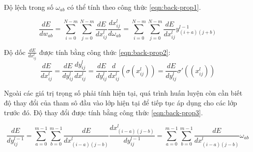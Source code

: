 Độ lệch trong số $\omega_{ab}$ có thể tính theo công thức \ref{eqn:back-prop1}.

\begin{equation}\label{eqn:back-prop}
	\frac{dE}{dw_{ab}} = \sum^{N-m}_{i=0}\sum^{N-m}_{j=0} \frac{dE}{dx^l_{ij}} \frac{dx^l_{ij}}{d\omega_{ab}} =  \sum^{N-m}_{i=0}\sum^{N-m}_{j=0} \frac{dE}{dx^l_{ij}} y^{l-1}_{(i+a)(j+b)}
\end{equation}

Độ dốc $\frac{dE}{dx^l_{ij}}$ được tính bằng công thức \ref{eqn:back-prop2}:
\begin{equation}\label{eqn:back-prop2}
	\frac{dE}{dx^l_{ij}} = \frac{dE}{dy^l_{ij}}\frac{dy^l_{ij}}{dx^l_{ij}} =  \frac{dE}{dy^l_{ij}} \frac{d}{dx^l_{ij}}(\sigma (x^l_{ij})) = \frac{dE}{dy^l_{ij}}\sigma' ((x^l_{ij}))
\end{equation}

Ngoài các giá trị trọng số phải tính hiện tại, quá trình huấn luyện còn cần biết độ thay đổi của tham sô đầu vào lớp hiện tại để tiếp tục áp dụng cho các lớp trước đó. Độ thay đổi được tính bằng công thức \ref{eqn:back-prop3}.

\begin{equation}\label{eqn:back-prop3}
	\frac{dE}{dy^{l-1}_{ij}} = \sum^{m-1}_{a=0} \sum^{m-1}_{b=0} \frac{dE}{dx^l_{(i-a)(j-b)}} \frac{dx^l_{(i-a)(j-b)}}{dy^{l-1}_{ij}} = \sum^{m-1}_{a=0} \sum^{m-1}_{b=0} \frac{dE}{dx^l_{(i-a)(j-b)}}\omega_{ab}
\end{equation}


